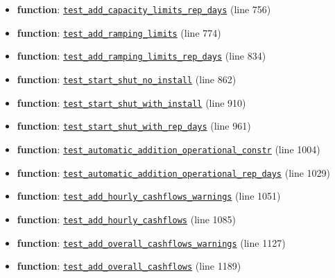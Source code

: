 \documentclass[11pt]{report}
\begin{document}
\begin{itemize}[leftmargin=*]
  \item \textbf{function}: \hyperref[def:pricetaker-tests-test_price_taker_model.py:test_add_capacity_limits_rep_days:L756]{\texttt{test\_add\_capacity\_limits\_rep\_days}} (line 756)
  \item \textbf{function}: \hyperref[def:pricetaker-tests-test_price_taker_model.py:test_add_ramping_limits:L774]{\texttt{test\_add\_ramping\_limits}} (line 774)
  \item \textbf{function}: \hyperref[def:pricetaker-tests-test_price_taker_model.py:test_add_ramping_limits_rep_days:L834]{\texttt{test\_add\_ramping\_limits\_rep\_days}} (line 834)
  \item \textbf{function}: \hyperref[def:pricetaker-tests-test_price_taker_model.py:test_start_shut_no_install:L862]{\texttt{test\_start\_shut\_no\_install}} (line 862)
  \item \textbf{function}: \hyperref[def:pricetaker-tests-test_price_taker_model.py:test_start_shut_with_install:L910]{\texttt{test\_start\_shut\_with\_install}} (line 910)
  \item \textbf{function}: \hyperref[def:pricetaker-tests-test_price_taker_model.py:test_start_shut_with_rep_days:L961]{\texttt{test\_start\_shut\_with\_rep\_days}} (line 961)
  \item \textbf{function}: \hyperref[def:pricetaker-tests-test_price_taker_model.py:test_automatic_addition_operational_constr:L1004]{\texttt{test\_automatic\_addition\_operational\_constr}} (line 1004)
  \item \textbf{function}: \hyperref[def:pricetaker-tests-test_price_taker_model.py:test_automatic_addition_operational_rep_days:L1029]{\texttt{test\_automatic\_addition\_operational\_rep\_days}} (line 1029)
  \item \textbf{function}: \hyperref[def:pricetaker-tests-test_price_taker_model.py:test_add_hourly_cashflows_warnings:L1051]{\texttt{test\_add\_hourly\_cashflows\_warnings}} (line 1051)
  \item \textbf{function}: \hyperref[def:pricetaker-tests-test_price_taker_model.py:test_add_hourly_cashflows:L1085]{\texttt{test\_add\_hourly\_cashflows}} (line 1085)
  \item \textbf{function}: \hyperref[def:pricetaker-tests-test_price_taker_model.py:test_add_overall_cashflows_warnings:L1127]{\texttt{test\_add\_overall\_cashflows\_warnings}} (line 1127)
  \item \textbf{function}: \hyperref[def:pricetaker-tests-test_price_taker_model.py:test_add_overall_cashflows:L1189]{\texttt{test\_add\_overall\_cashflows}} (line 1189)

\end{itemize}
\end{document}
